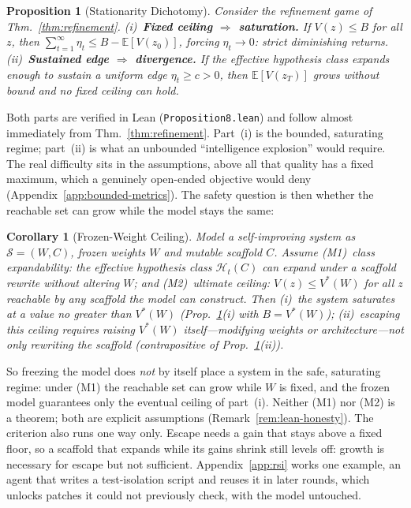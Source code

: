 \documentclass{article}
\newtheorem{corollary}[theorem]{Corollary}
\newtheorem{proposition}[theorem]{Proposition}
\theoremstyle{remark}
\theoremstyle{plain}
\newcommand{\Hyp}{\mathcal{H}}
\begin{document}
\begin{proposition}[Stationarity Dichotomy]
\label{prop:dichotomy}
Consider the refinement game of Thm.~\ref{thm:refinement}. (i)~\textbf{Fixed ceiling $\Rightarrow$ saturation.} If $V(z)\le B$ for all $z$, then $\sum_{t=1}^\infty\eta_t\le B-\mathbb{E}[V(z_0)]$, forcing $\eta_t\to0$: strict diminishing returns. (ii)~\textbf{Sustained edge $\Rightarrow$ divergence.} If the effective hypothesis class expands enough to sustain a uniform edge $\eta_t\ge c>0$, then $\mathbb{E}[V(z_T)]$ grows without bound and no fixed ceiling can hold.
\end{proposition}

Both parts are verified in Lean (\texttt{Proposition8.lean}) and follow almost immediately from Thm.~\ref{thm:refinement}. Part~(i) is the bounded, saturating regime; part~(ii) is what an unbounded ``intelligence explosion'' would require. The real difficulty sits in the assumptions, above all that quality has a fixed maximum, which a genuinely open-ended objective would deny (Appendix~\ref{app:bounded-metrics}). The safety question is then whether the reachable set can grow while the model stays the same:

\begin{corollary}[Frozen-Weight Ceiling]
\label{cor:frozen-ceiling}
Model a self-improving system as $\mathcal{S}=(W,C)$, frozen weights $W$ and mutable scaffold $C$. Assume (M1)~\emph{class expandability}: the effective hypothesis class $\Hyp_t(C)$ can expand under a scaffold rewrite without altering $W$; and (M2)~\emph{ultimate ceiling}: $V(z)\le V^*(W)$ for all $z$ reachable by any scaffold the model can construct. Then (i)~the system saturates at a value no greater than $V^*(W)$ (Prop.~\ref{prop:dichotomy}(i) with $B=V^*(W)$); (ii)~escaping this ceiling requires raising $V^*(W)$ itself---modifying weights or architecture---not only rewriting the scaffold (contrapositive of Prop.~\ref{prop:dichotomy}(ii)).
\end{corollary}

So freezing the model does \emph{not} by itself place a system in the safe, saturating regime: under (M1) the reachable set can grow while $W$ is fixed, and the frozen model guarantees only the eventual ceiling of part~(i). Neither (M1) nor (M2) is a theorem; both are explicit assumptions (Remark~\ref{rem:lean-honesty}). The criterion also runs one way only. Escape needs a gain that stays above a fixed floor, so a scaffold that expands while its gains shrink still levels off: growth is necessary for escape but not sufficient. Appendix~\ref{app:rsi} works one example, an agent that writes a test-isolation script and reuses it in later rounds, which unlocks patches it could not previously check, with the model untouched.
\end{document}
